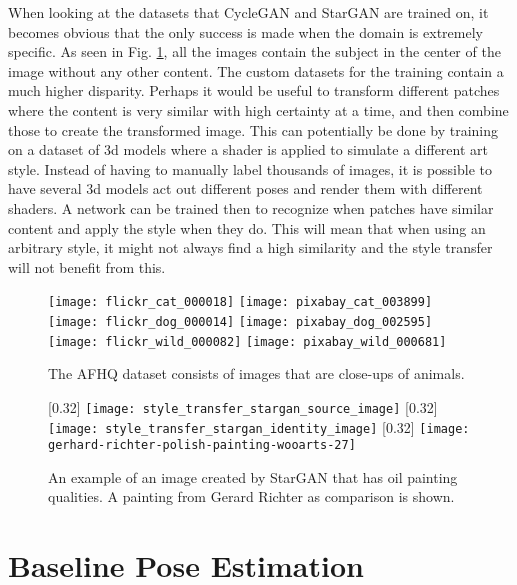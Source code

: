 When looking at the datasets that CycleGAN and StarGAN are trained on, it becomes obvious that the only success is made when the domain is extremely specific.
As seen in Fig. \ref{fig:AFHQ}, all the images contain the subject in the center of the image without any other content.
The custom datasets for the training contain a much higher disparity.
Perhaps it would be useful to transform different patches where the content is very similar with high certainty at a time, and then combine those to create the transformed image.
This can potentially be done by training on a dataset of 3d models where a shader is applied to simulate a different art style.
Instead of having to manually label thousands of images, it is possible to have several 3d models act out different poses and render them with different shaders.
A network can be trained then to recognize when patches have similar content and apply the style when they do.
This will mean that when using an arbitrary style, it might not always find a high similarity and the style transfer will not benefit from this.

\begin{figure}
	\centering
    \texttt{[image: flickr\_cat\_000018]}%
    \texttt{[image: pixabay\_cat\_003899]}%
    \texttt{[image: flickr\_dog\_000014]}%
    \texttt{[image: pixabay\_dog\_002595]}%
    \texttt{[image: flickr\_wild\_000082]}%
    \texttt{[image: pixabay\_wild\_000681]}%
	\caption{The \gls{AFHQ} dataset consists of images that are close-ups of animals.}
	\label{fig:AFHQ}
\end{figure}

\begin{figure}
    \centering
	[0.32\textwidth]{%
		\texttt{[image: style\_transfer\_stargan\_source\_image]}%
	}
	[0.32\textwidth]{%
		\texttt{[image: style\_transfer\_stargan\_identity\_image]}%
	}
	[0.32\textwidth]{%
		\texttt{[image: gerhard-richter-polish-painting-wooarts-27]}%
	}
	\label{fig:style_transfer_stargan_identity_image}
	\caption{
		An example of an image created by StarGAN that has oil painting qualities. A painting from Gerard Richter as comparison is shown.
	}
\end{figure}

\section{Baseline Pose Estimation}

